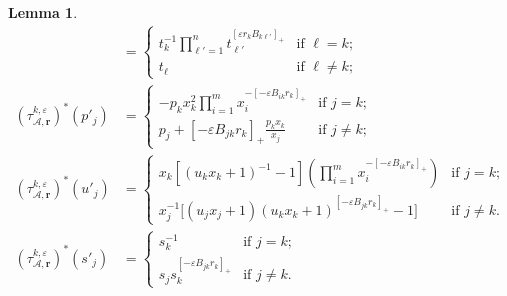 \documentclass{amsart}
\newtheorem{lemma}[theorem]{Lemma}
\numberwithin{equation}{section}
\newcommand{\bfr}{{\boldsymbol{r}}}
\newcommand{\cA}{\mathcal{A}}
\begin{document}
\begin{lemma}
\begin{align}
    &=\begin{cases} 
      t_k^{-1}\prod\limits_{\ell'=1}^n t_{\ell'}^{[\varepsilon r_k B_{k\ell'}]_+} & \text{if $\ell=k$;}\\
      t_\ell & \text{if $\ell\ne k$;}
    \end{cases}\\
    \label{eq:tropical GA transformation}
    (\tau_{\cA,\bfr}^{k,\varepsilon})^*(p'_j)&=
    \begin{cases} 
      -p_k x_k^2 \prod\limits_{i=1}^m x_i^{-[-\varepsilon B_{ik} r_k]_+} & \text{if $j=k$;}\\ 
      p_j + [-\varepsilon B_{jk} r_k]_+ \frac{p_k x_k}{x_j} & \text{if $j\ne k$;}
    \end{cases}\\
    \label{eq:tropical BA transformation}
    (\tau_{\cA,\bfr}^{k,\varepsilon})^*(u'_j)
    &=\begin{cases} 
      x_k \left[ (u_k x_k +1)^{-1} -1\right] \left(\prod_{i=1}^m x_i^{-[-\varepsilon B_{ik} r_k]_+}\right) & \text{if $j=k$;}\\ 
      x_j^{-1}\big[(u_j x_j + 1) (u_k x_k + 1)^{[-\varepsilon B_{jk} r_k]_+}-1\big] & \text{if $j\ne k$.}
    \end{cases}\\
    \label{eq:tropical DA transformation}
    (\tau_{\cA,\bfr}^{k,\varepsilon})^*(s'_j)
    &=\begin{cases} 
      s_k^{-1} & \text{if $j=k$;}\\ 
      s_j s_k^{[-\varepsilon B_{jk} r_k]_+} & \text{if $j\ne k$.}
    \end{cases}
  \end{align}
\end{lemma}
\end{document}
